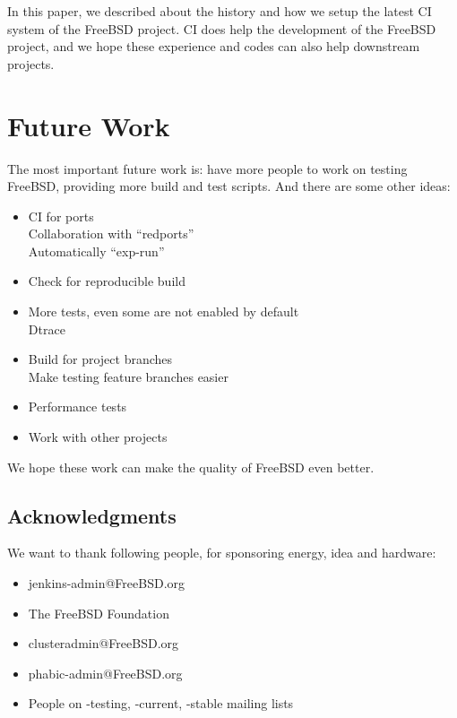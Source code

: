 \documentclass[a4paper,twocolumn,10pt]{article}
\begin{document}
In this paper, we described about the history and how we setup the latest CI
system of the FreeBSD project.  CI does help the development of the FreeBSD
project, and we hope these experience and codes can also help downstream
projects.

\section{Future Work}

The most important future work is: have more people to work on testing FreeBSD,
providing more build and test scripts. And there are some other ideas:

\begin{itemize}
\item CI for ports\\
  Collaboration with ``redports''\\
  Automatically ``exp-run''
\item Check for reproducible build
\item More tests, even some are not enabled by default\\
Dtrace
\item Build for project branches\\
Make testing feature branches easier
\item Performance tests
\item Work with other projects
\end{itemize}

We hope these work can make the quality of FreeBSD even better.

\subsection*{Acknowledgments}

We want to thank following people, for sponsoring energy, idea and hardware:

\begin{itemize}
\item jenkins-admin@FreeBSD.org
\item The FreeBSD Foundation
\item clusteradmin@FreeBSD.org
\item phabic-admin@FreeBSD.org
\item People on -testing, -current, -stable mailing lists
\end{itemize}

{\footnotesize 
}
\end{document}
